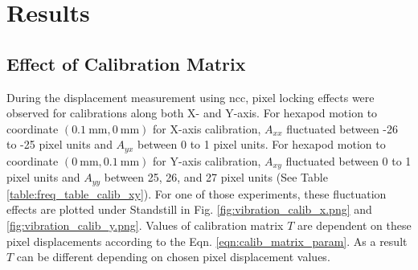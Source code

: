 \chapter{Results} \label{chapter:results}



\section{Effect of Calibration Matrix} \label{section:results_discussion_calib}
    During the displacement measurement using \gls{ncc}, pixel locking\cite{raffel} effects were observed for calibrations along both X- and Y-axis. For hexapod motion to coordinate $(\SI{0.1}{\milli\meter}, \SI{0}{\milli\meter})$ for X-axis calibration, $A_{xx}$ fluctuated between -26 to -25 pixel units and $A_{yx}$ between 0 to 1 pixel units. For hexapod motion to coordinate $(\SI{0}{\milli\meter}, \SI{0.1}{\milli\meter})$ for Y-axis calibration, $A_{xy}$ fluctuated between 0 to 1 pixel units and $A_{yy}$ between 25, 26, and 27 pixel units (See Table \ref{table:freq_table_calib_xy}). For one of those experiments, these fluctuation effects are plotted under \textsf{Standstill} in Fig. \ref{fig:vibration_calib_x.png} and \ref{fig:vibration_calib_y.png}. Values of calibration matrix $T$ are dependent on these pixel displacements according to the Eqn. \ref{eqn:calib_matrix_param}. As a result $T$ can be different depending on chosen pixel displacement values.

